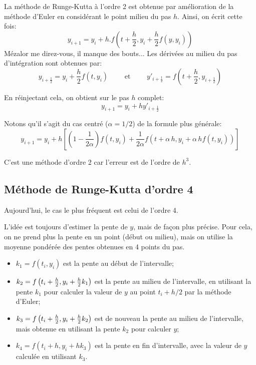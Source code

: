 La méthode de Runge-Kutta à l'ordre 2 est obtenue par amélioration
de la méthode d'Euler en considérant le point milieu du pas $h$.
Ainsi, on écrit cette fois:
\begin{equation}
y_{i+1}=y_i+h.f\left(t+\frac{h}2,y_i+\frac{h}2f(y,y_i)\right)
\end{equation}
Mézalor me direz-vous, il manque des bouts...
Les dérivées au milieu du pas d'intégration sont obtenues par:
\begin{equation}
    y_{i+\frac{1}{2}} = y_i + \frac{h}{2} f \left( t, y_i \right) \qquad \text{ et } \qquad
    y'_{i+\frac{1}{2}} = f \left( t + \frac{h}{2}, y_{i+\frac{1}{2}} \right) 
\end{equation}

En réinjectant cela, on obtient sur le pas $h$ complet:
\begin{equation}
    y_{i+1} = y_i + h y'_{i+\frac{1}{2}} 
\end{equation}

\medskip
Notons qu'il s'agit du cas centré ($\alpha=1/2$) de la formule plus
générale:
\begin{equation}
y_{i+1} = y_i + h\left[\left(1-\frac1{2\alpha}\right)f \left( t, y_i \right) + \frac1{2\alpha}f \left( t + \alpha\,h, y_i + \alpha\,h f \left( t, y_i \right) \right)\right] 
\end{equation}

\medskip
C'est une méthode d'ordre 2 car l'erreur est de l'ordre de $h^3$.


\medskip
\subsection{Méthode de Runge-Kutta d'ordre 4}

Aujourd'hui, le cas le plus fréquent est celui de l'ordre 4.

L'idée est toujours d'estimer la pente de $y$, mais de façon plus précise.
Pour cela, on ne prend plus la pente en un point (début ou milieu), mais on utilise
la moyenne pondérée des pentes obtenues en 4 points du pas.
\begin{itemize}
   \item $k_1 = f \left( t_i, y_i \right) $ est la pente au début de l'intervalle;
   \item $k_2 = f \left( t_i + {h \over 2}, y_i + {h\over 2} k_1 \right)$ est la pente 
	au milieu de l'intervalle, en utilisant la pente $k_1$ pour calculer la valeur de $y$ 
	au point $t_i + h/2$ par la méthode d'Euler;
   \item $k_3 = f \left( t_i + {h \over 2}, y_i + {h\over 2} k_2 \right)$ est de nouveau 
	la pente au milieu de l'intervalle, mais obtenue en utilisant la pente $k_2$ pour calculer $y$;
   \item $k_4 = f \left( t_i + h, y_i + h k_3\right)$ est la pente en fin d'intervalle, avec la valeur 
	de $y$ calculée en utilisant $k_3$.
\end{itemize}

